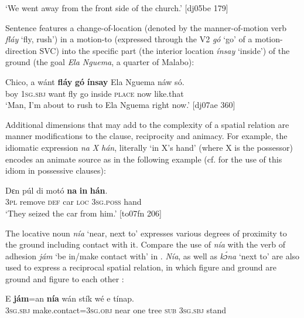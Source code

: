 \glt ‘We went away from the front side of the church.’ [dj05be 179]
\z

Sentence  features a change-of-location (denoted by the manner-of-motion verb \textit{fláy} ‘fly, rush’) in a motion-to (expressed through the V2 \textit{gó} ‘go’ of a motion-direction SVC) into the specific part (the interior location \textit{ínsay} ‘inside’) of the ground (the goal \textit{Ela Nguema}, a quarter of Malabo):


\ea%
    \label{ex:key:990}
    \gll Chico,  a    wánt  \textbf{fláy}  \textbf{gó}  \textbf{ínsay}  {Ela  Nguema}  náw    só.\\
boy    \textsc{1sg.sbj}  want  fly  go  inside  \textsc{place}    now    like.that\\

\glt ‘Man, I’m about to rush to Ela Nguema right now.’ [dj07ae 360]
\z

Additional dimensions that may add to the complexity of a spatial relation are manner modifications to the clause, reciprocity and animacy. For example, the idiomatic expression \textit{na} \textit{X hán}, literally ‘in X’s hand’ (where X is the possessor) encodes an animate source as in the following example (cf.  for the use of this idiom in possessive clauses):


\ea%
    \label{ex:key:991}
    \gll Dɛn  púl    di  motó  \textbf{na}  \textbf{in}    \textbf{hán}.\\
\textsc{3pl}  remove  \textsc{def}  car    \textsc{loc}  \textsc{3sg.poss}  hand\\

\glt ‘They seized the car from him.’ [to07fn 206]
\z

The locative noun \textit{nía} ‘near, next to’ expresses various degrees of proximity to the ground including contact with it. Compare the use of \textit{nía} with the verb of adhesion \textit{jám} ‘be in/make contact with’ in . \textit{Nía}, as well as \textit{kɔ́na} ‘next to’ are also used to express a reciprocal spatial relation, in which figure and ground are ground and figure to each other : 


\ea%
    \label{ex:key:992}
    \gll E    \textbf{jám}=an        \textbf{nía}    wán    stík  wé  e    tínap.\\
\textsc{3sg.sbj}  make.contact=\textsc{3sg.obj}  near    one    tree  \textsc{sub}  \textsc{3sg.sbj}  stand\\

